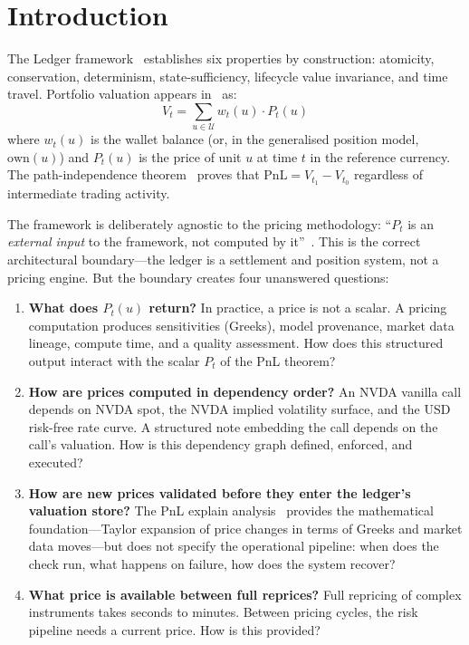 \documentclass[11pt,a4paper]{article}
\begin{document}
\tableofcontents
\clearpage

\section{Introduction}
\label{sec:intro}

The Ledger framework~\cite{ledger} establishes six properties by construction: atomicity, conservation, determinism, state-sufficiency, lifecycle value invariance, and time travel.  Portfolio valuation appears in~\cite[\S4]{ledger} as:
\[
V_t = \sum_{u \in \mathcal{U}} w_t(u) \cdot P_t(u)
\]
where $w_t(u)$ is the wallet balance (or, in the generalised position model, $\mathrm{own}(u)$) and $P_t(u)$ is the price of unit $u$ at time $t$ in the reference currency.  The path-independence theorem~\cite[\S4.3]{ledger} proves that $\mathrm{PnL} = V_{t_1} - V_{t_0}$ regardless of intermediate trading activity.

The framework is deliberately agnostic to the pricing methodology: ``$P_t$ is an \emph{external input} to the framework, not computed by it''~\cite[\S4.1]{ledger}.  This is the correct architectural boundary---the ledger is a settlement and position system, not a pricing engine.  But the boundary creates four unanswered questions:

\begin{enumerate}
\item \textbf{What does $P_t(u)$ return?}  In practice, a price is not a scalar.  A pricing computation produces sensitivities (Greeks), model provenance, market data lineage, compute time, and a quality assessment.  How does this structured output interact with the scalar $P_t$ of the PnL theorem?

\item \textbf{How are prices computed in dependency order?}  An NVDA vanilla call depends on NVDA spot, the NVDA implied volatility surface, and the USD risk-free rate curve.  A structured note embedding the call depends on the call's valuation.  How is this dependency graph defined, enforced, and executed?

\item \textbf{How are new prices validated before they enter the ledger's valuation store?}  The PnL explain analysis~\cite{pnl_explain} provides the mathematical foundation---Taylor expansion of price changes in terms of Greeks and market data moves---but does not specify the operational pipeline: when does the check run, what happens on failure, how does the system recover?

\item \textbf{What price is available between full reprices?}  Full repricing of complex instruments takes seconds to minutes.  Between pricing cycles, the risk pipeline needs a current price.  How is this provided?
\end{enumerate}
\end{document}
